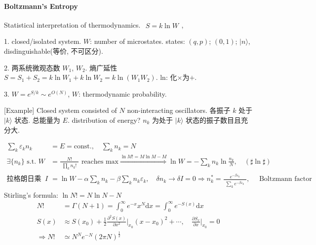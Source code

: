 \documentclass[../../main.tex]{subfiles}
\begin{document}
\paragraph{Boltzmann's Entropy}
Statistical interpretation of thermodynamics. $\begin{aligned}
        S = k\ln{W}
    \end{aligned}$, 

1. closed/isolated system. $W$: number of microstates. states: $(q,p)$; $(0,1)$; $|n\rangle$, disdinguishable(等价, 不可区分). 
        
2. 两系统微观态数 $W_{1}$, $W_{2}$. 熵广延性 $S = S_{1} + S_{2} = k\ln{W_{1}} + k\ln{W_{2}} = k\ln{(W_{1}W_{2})}$. ln: 化$\times$为$+$.
        
3. $W = e^{S/k}\sim e^{O(N)}$, $W$: thermodynamic probability. 

[Example] Closed system consisted of $N$ non-interacting oscillators. 各振子 $k$ 处于 $|k\rangle$ 状态. 总能量为 $E$. distribution of energy? $n_{k}$ 为处于 $|k\rangle$ 状态的振子数目且充分大.

    \begin{align*}
        \sum_{k}\varepsilon_{k}n_{k} &= E = \text{const.},\quad \sum_{k}n_{k} = N\\
        \exists\{n_{k}\}\text{ s.t. } W &= \frac{N!}{\begin{aligned}
            \prod_{k}n_{k}!
        \end{aligned}}\text{ reaches max}
        \stackrel{\ln{M!} = M\ln{M} - M}{\Longrightarrow}\ln{W} = -\sum_{k}n_{k}\ln{\frac{n_{k}}{N}},\quad (\sharp\ln{\sharp})\\
        \text{拉格朗日乘子法: }I &= \ln{W} - \alpha\sum_{k}n_{k} - \beta\sum_{k}n_{k}\varepsilon_{k},\quad
        \delta n_{k}\rightarrow \delta I = 0\Rightarrow n_{k}^{*} = \frac{e^{-\beta \varepsilon_{k}}}{\begin{aligned}
            \sum_{k}e^{-\beta \varepsilon_{k}}
        \end{aligned}},\quad \text{ Boltzmann factor}
    \end{align*}
    Stirling's formula: $\ln{N!} = N\ln{N} - N$
    \begin{align*}
        N! &= \Gamma(N+1) = \int_{0}^{\infty}e^{-x}x^{N}\mathrm{d}x = \int_{0}^{\infty} e^{-S(x)}\mathrm{d}x\\
        S(x)&\approx S(x_{0}) + \frac{1}{2}\frac{\partial^{2}S(x)}{\partial x^{2}}\bigg|_{x_{0}}(x-x_{0})^{2} + \cdots,\quad \frac{\partial S_{x}}{\partial x}\bigg|_{x_{0}} = 0\\
        \Rightarrow N!&\simeq N^{N}e^{-N}(2\pi N)^{\frac{1}{2}}
    \end{align*}
\end{document}
